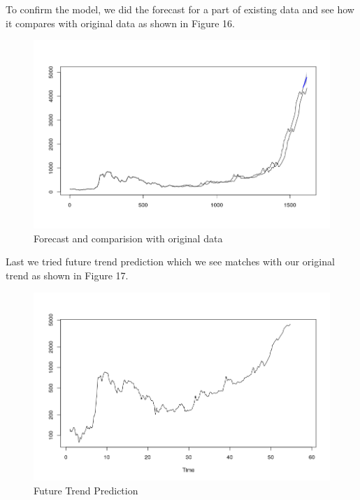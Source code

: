 \documentclass{article}
\begin{document}
To confirm the model, we did the forecast for a part of existing data and see how it compares with original data as shown in Figure 16.

\begin{figure}[ht]
	\centering
	\includegraphics[scale=0.25]{images/ts_images/ForecastedImageH25.png}
	\caption{Forecast and comparision with original data}
	\label{fig: Forecast and Comparision with original data}
\end{figure}

Last we tried future trend prediction which we see matches with our original trend as shown in Figure 17.

\begin{figure}[ht]
	\centering
	\includegraphics[scale=0.25]{images/ts_images/FutureTrendPrediction.png}
	\caption{Future Trend Prediction}
	\label{fig: Future Trend Prediction}
\end{figure}
\end{document}
